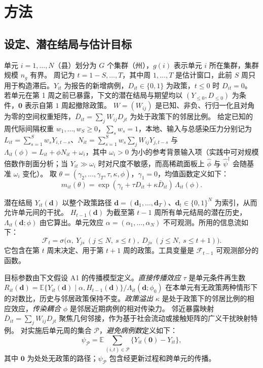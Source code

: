 \documentclass[11pt,a4paper]{ctexart}
\theoremstyle{definition}
\newcommand{\E}{\mathbb{E}}
\newcommand{\F}{\mathcal{F}}
\begin{document}
\section{方法}
\label{s:methods}

\subsection{设定、潜在结局与估计目标}

单元 $i=1,\dots,N$（县）划分为 $G$ 个集群（州），$g(i)$ 表示单元 $i$ 所在集群，集群规模 $n_g$ 有界。
周记为 $t=1-S,\dots,T$，其中周 $1,\dots,T$ 是估计窗口，此前 $S$ 周只用于构造滞后。$Y_{it}$ 为报告的新增病例，$D_{it}\in\{0,1\}$ 为政策，$t\le 0$ 时 $D_{it}=0$。
若单元在第 1 周之前已暴露，下文的潜在结局与期望均以 $(Y_{\le 0},D_{\le 0})$ 为条件，$\mathbf 0$ 表示自第 $1$ 周起撤除政策。
$W=(W_{ij})$ 是已知、非负、行归一化且对角为零的空间权重矩阵，$\bar D_{it}=\sum_j W_{ij}D_{jt}$ 为处于政策下的邻居比例。
给定已知的周代际间隔权重 $w_1,\dots,w_S\ge 0$，$\sum_s w_s=1$\citep{wallinga2007generation}，本地、输入与总感染压力分别记为 $L_{it}=\sum_{s=1}^{S} w_s Y_{i,t-s}$、$N_{it}=\sum_{s=1}^{S} w_s \sum_{j} W_{ij}Y_{j,t-s}$ 与 $\Lambda_{it}(\phi)=L_{it}+\phi N_{it}+\omega_i$，其中 $\omega_i>0$ 为小的参考背景输入项（实践中可对规模倍数作剖面分析；当 $Y_{it}\gg\omega_i$ 时对尺度不敏感，而高稀疏面板上 $\hat\phi$ 与 $\hat\psi^\dagger$ 会随基准 $\omega_i$ 变化）。
取 $\theta=(\gamma_2,\dots,\gamma_T,\tau,\kappa,\phi)$，$\gamma_1=0$，均值函数定义如下：
\begin{equation}
m_{it}(\theta)=\exp(\gamma_t+\tau D_{it}+\kappa\bar D_{it})\,\Lambda_{it}(\phi).
\label{eq:mean}
\end{equation}

潜在结局 $Y_{it}(\mathbf d)$ 以整个政策路径 $\mathbf d=(\mathbf d_1,\dots,\mathbf d_T)$、$\mathbf d_t\in\{0,1\}^N$ 为索引，从而允许单元间的干扰\citep{hudgens2008interference}。
$H_{t-1}(\mathbf d)$ 为截至第 $t-1$ 周所有单元结局的潜在历史，$\Lambda_{it}(\mathbf d;\phi)$ 由它算出。单元效应 $\alpha=(\alpha_1,\dots,\alpha_N)$ 不可观测。所用的信息流如下：
\[
\F_t=\sigma\bigl(\alpha,\ Y_{js}\ (j\le N,\ s\le t),\ D_{js}\ (j\le N,\ s\le t+1)\bigr).
\]
它包含在第 $t$ 周末决定、用于第 $t+1$ 周的政策。工具变量是 $\F_{t-1}$ 可观测部分的函数。

目标参数由下文假设 A1 的传播模型定义。\emph{直接传播效应} $\tau$ 是单元条件再生数
$R_{it}(\mathbf d)=\E\{Y_{it}(\mathbf d)\mid\alpha,H_{t-1}(\mathbf d)\}/\Lambda_{it}(\mathbf d;\phi_0)$
在本单元有无政策两种情形下的对数比，历史与邻居政策保持不变。\emph{政策溢出} $\kappa$ 是处于政策下的邻居比例的相应效应，\emph{传染耦合} $\phi$ 是邻居近期病例的相对传染力。
邻近暴露映射 $\bar D_{it}=\sum_j W_{ij}D_{jt}$ 聚焦几何邻接，作为基于社会流动或接触矩阵的广义干扰映射特例\citep{aronow2017exposure,cai2021contagion,hettinger2025doubly,xu2026dynamic}。
对实施后单元周的集合 $\mathcal P$，\emph{避免病例数}定义如下：
\begin{equation}
\psi_{\mathcal P}=\E\sum_{(i,t)\in\mathcal P}\{Y_{it}(\mathbf 0)-Y_{it}\},
\label{eq:psi}
\end{equation}
其中 $\mathbf 0$ 为处处无政策的路径；$\psi_{\mathcal P}$ 包含经更新过程和跨单元的传播。
\end{document}
